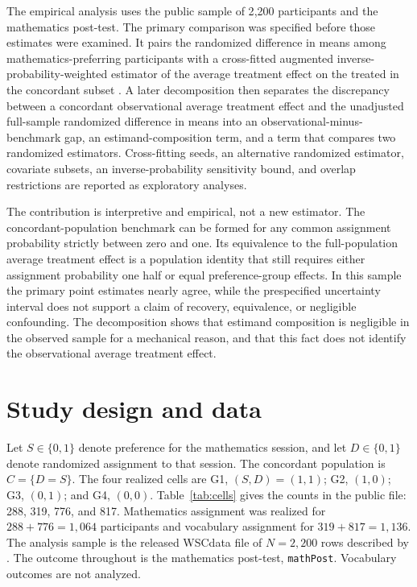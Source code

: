 \documentclass[11pt]{article}
\theoremstyle{remark}
\begin{document}
The empirical analysis uses the public sample of 2{,}200 participants and the mathematics post-test. The primary comparison was specified before those estimates were examined. It pairs the randomized difference in means among mathematics-preferring participants with a cross-fitted augmented inverse-probability-weighted estimator of the average treatment effect on the treated in the concordant subset \citep{bang2005,chernozhukov2018}. A later decomposition then separates the discrepancy between a concordant observational average treatment effect and the unadjusted full-sample randomized difference in means into an observational-minus-benchmark gap, an estimand-composition term, and a term that compares two randomized estimators. Cross-fitting seeds, an alternative randomized estimator, covariate subsets, an inverse-probability sensitivity bound, and overlap restrictions are reported as exploratory analyses.

The contribution is interpretive and empirical, not a new estimator. The concordant-population benchmark can be formed for any common assignment probability strictly between zero and one. Its equivalence to the full-population average treatment effect is a population identity that still requires either assignment probability one half or equal preference-group effects. In this sample the primary point estimates nearly agree, while the prespecified uncertainty interval does not support a claim of recovery, equivalence, or negligible confounding. The decomposition shows that estimand composition is negligible in the observed sample for a mechanical reason, and that this fact does not identify the observational average treatment effect.

\section{Study design and data}
\label{sec:design}

Let $S\in\{0,1\}$ denote preference for the mathematics session, and let $D\in\{0,1\}$ denote randomized assignment to that session. The concordant population is $C=\{D=S\}$. The four realized cells are G1, $(S,D)=(1,1)$; G2, $(1,0)$; G3, $(0,1)$; and G4, $(0,0)$. Table~\ref{tab:cells} gives the counts in the public file: 288, 319, 776, and 817. Mathematics assignment was realized for $288+776=1{,}064$ participants and vocabulary assignment for $319+817=1{,}136$. The analysis sample is the released WSCdata file of $N=2{,}200$ rows described by \citet{keller2025}. The outcome throughout is the mathematics post-test, \texttt{mathPost}. Vocabulary outcomes are not analyzed.
\end{document}
